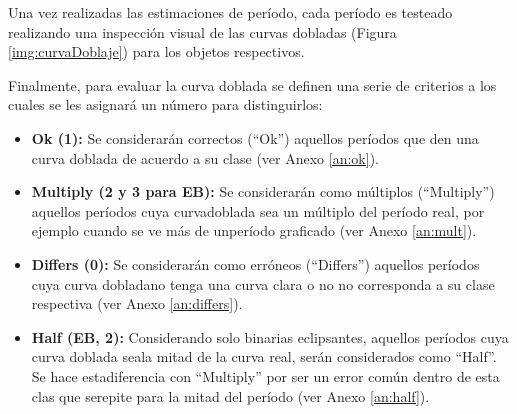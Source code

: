 	Una vez realizadas las estimaciones de período, cada período es testeado realizando una inspección visual de las curvas dobladas (Figura \ref{img:curvaDoblaje}) para los objetos respectivos. 
    
    
    Finalmente, para evaluar la curva doblada se definen una serie de criterios  a los cuales se les asignará un número para distinguirlos:
    
    \begin{itemize}
        \item \textbf{Ok (1):} Se considerarán correctos (``Ok'') aquellos períodos que den una curva doblada de acuerdo a su clase (ver Anexo \ref{an:ok}).
        
        \item \textbf{Multiply (2 y 3 para EB):} Se considerarán como múltiplos (“Multiply”) aquellos períodos cuya curvadoblada sea un múltiplo del período real, por ejemplo cuando se ve más de unperíodo graficado (ver Anexo \ref{an:mult}).
        
        \item \textbf{Differs (0):} Se considerarán como erróneos (“Differs”) aquellos períodos cuya curva dobladano tenga una curva clara o no no corresponda a su clase respectiva (ver Anexo \ref{an:differs}).
        
        \item \textbf{Half (EB, 2):} Considerando solo binarias eclipsantes, aquellos períodos cuya curva doblada seala mitad de la curva real, serán considerados como “Half”. Se hace estadiferencia con “Multiply” por ser un error común dentro de esta clas que serepite para la mitad del período (ver Anexo \ref{an:half}).
    \end{itemize}
    
